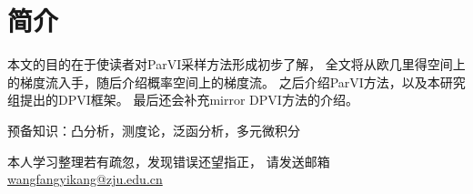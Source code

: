 \section{简介}

本文的目的在于使读者对ParVI采样方法形成初步了解，
全文将从欧几里得空间上的梯度流入手，随后介绍概率空间上的梯度流。
之后介绍ParVI方法，以及本研究组提出的DPVI框架。
最后还会补充mirror DPVI方法的介绍。
\par
预备知识：凸分析，测度论，泛函分析，多元微积分
\par
本人学习整理若有疏忽，发现错误还望指正，
请发送邮箱\href{wangfangyikang@zju.edu.cn}{wangfangyikang@zju.edu.cn}